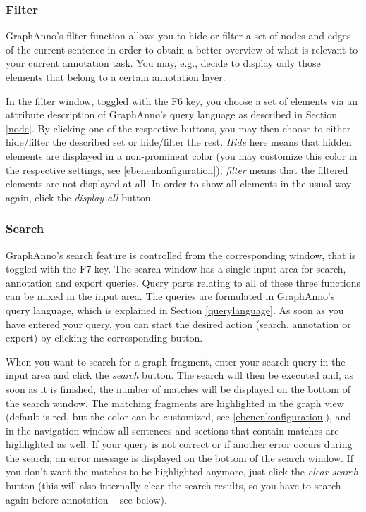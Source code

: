 \documentclass[12pt]{scrartcl}
\begin{document}
\subsubsection{Filter}

GraphAnno’s filter function allows you to hide or filter a set of nodes and edges of the current sentence in order to obtain a better overview of what is relevant to your current annotation task.
You may, e.g., decide to display only those elements that belong to a certain annotation layer.

In the filter window, toggled with the F6 key, you choose a set of elements via an attribute description of GraphAnno’s query language as described in Section \ref{node}.
By clicking one of the respective buttons, you may then choose to either hide/filter the described set or hide/filter the rest.
\textit{Hide} here means that hidden elements are displayed in a non-prominent color (you may customize this color in the respective settings, see \ref{ebenenkonfiguration}); \textit{filter} means that the filtered elements are not displayed at all.
In order to show all elements in the usual way again, click the \textit{display all} button.

\subsubsection{Search}\label{window-search}

GraphAnno’s search feature is controlled from the corresponding window, that is toggled with the F7 key.
The search window has a single input area for search, annotation and export queries.
Query parts relating to all of these three functions can be mixed in the input area.
The queries are formulated in GraphAnno’s query language, which is explained in Section \ref{querylanguage}.
As soon as you have entered your query, you can start the desired action (search, annotation or export) by clicking the corresponding button.

When you want to search for a graph fragment, enter your search query in the input area and click the \textit{search} button.
The search will then be executed and, as soon as it is finished, the number of matches will be displayed on the bottom of the search window.
The matching fragments are highlighted in the graph view (default is red, but the color can be customized, see \ref{ebenenkonfiguration}), and in the navigation window all sentences and sections that contain matches are highlighted as well.
If your query is not correct or if another error occurs during the search, an error message is displayed on the bottom of the search window.
If you don’t want the matches to be highlighted anymore, just click the \textit{clear search} button (this will also internally clear the search results, so you have to search again before annotation – see below).
\end{document}
